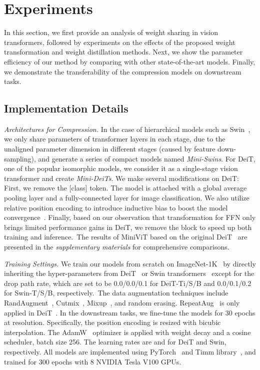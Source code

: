 \documentclass[10pt,twocolumn,letterpaper]{article}
\begin{document}
    \section{Experiments}
    In this section, we first provide an analysis of weight sharing in vision transformers, followed by experiments on the effects of the proposed weight transformation and weight distillation methods. Next, we show the parameter efficiency of our method by comparing with other state-of-the-art models. Finally, we demonstrate the transferability of the compression models on downstream tasks.
    
    \vspace{-1mm}
    \subsection{Implementation Details}

\textit{Architectures for Compression.} 
In the case of hierarchical models such as Swin~\cite{Swin}, we only share parameters of transformer layers in each stage, due to the unaligned parameter dimension in different stages (caused by feature down-sampling), and generate a series of compact models named \textit{Mini-Swins}. For DeiT, one of the popular isomorphic models, we consider it as a single-stage vision transformer and create \textit{Mini-DeiTs}. We make several modifications on DeiT: First, we remove the [class] token. The model is attached with a global average pooling layer and a fully-connected layer for image classification. We also utilize relative position encoding to introduce inductive bias to boost the model convergence~\cite{deit, irpe}. Finally, based on our observation that transformation for FFN only brings limited performance gains in DeiT, we remove the block to speed up both training and inference.~The results of MiniViT based on the original DeiT~\cite{deit} are presented in the \textit{supplementary materials} for comprehensive comparisons.

\textit{Training Settings.} We train our models from scratch on ImageNet-1K~\cite{imagenet} by directly inheriting the hyper-parameters from DeiT~\cite{deit} or Swin transformers~\cite{Swin} except for the drop path rate, which are set to be 0.0/0.0/0.1 for DeiT-Ti/S/B and 0.0/0.1/0.2 for Swin-T/S/B, respectively.~The data augmentation techniques include RandAugment~\cite{randaug}, Cutmix~\cite{cutmix}, Mixup~\cite{mixup}, and random erasing. RepeatAug~\cite{repeat_aug} is only applied in DeiT~\cite{deit}. 
In the downstream tasks, we fine-tune the models for 30 epochs at  resolution. Specifically, the position encoding is resized with bicubic interpolation. The AdamW~\cite{adamw} optimizer is applied with weight decay  and a cosine scheduler, batch size 256. The learning rates are  and  for DeiT and Swin, respectively.
All models are implemented using PyTorch~\cite{pytorch} and Timm library~\cite{timm}, and trained for 300 epochs with 8 NVIDIA Tesla V100 GPUs. 
\end{document}

